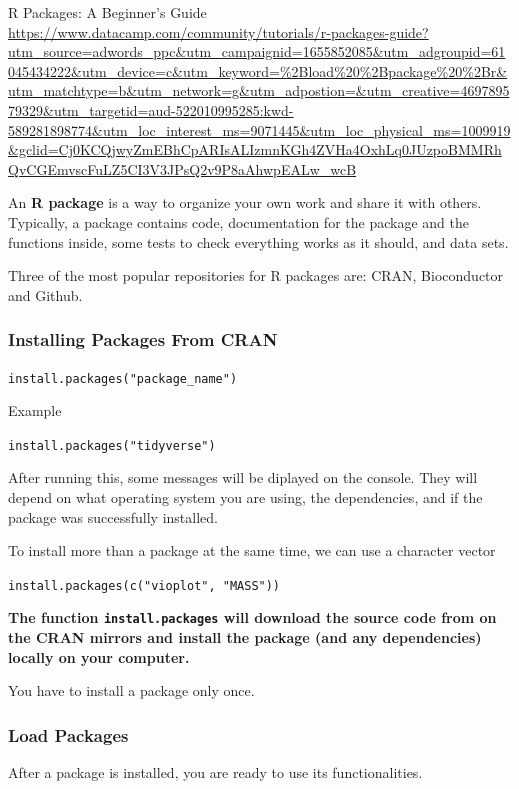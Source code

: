 \documentclass[
]{book}
\begin{document}
R Packages: A Beginner's Guide \url{https://www.datacamp.com/community/tutorials/r-packages-guide?utm_source=adwords_ppc\&utm_campaignid=1655852085\&utm_adgroupid=61045434222\&utm_device=c\&utm_keyword=\%2Bload\%20\%2Bpackage\%20\%2Br\&utm_matchtype=b\&utm_network=g\&utm_adpostion=\&utm_creative=469789579329\&utm_targetid=aud-522010995285:kwd-589281898774\&utm_loc_interest_ms=9071445\&utm_loc_physical_ms=1009919\&gclid=Cj0KCQjwyZmEBhCpARIsALIzmnKGh4ZVHa4OxhLq0JUzpoBMMRhQvCGEmvscFuLZ5CI3V3JPsQ2v9P8aAhwpEALw_wcB}

An \textbf{R package} is a way to organize your own work and share it with others. Typically, a package contains code, documentation for the package and the functions inside, some tests to check everything works as it should, and data sets.

Three of the most popular repositories for R packages are: CRAN, Bioconductor and Github.

\hypertarget{installing-packages-from-cran}{%
\subsubsection{Installing Packages From CRAN}\label{installing-packages-from-cran}}

\texttt{install.packages("package\_name")}

Example

\texttt{install.packages("tidyverse")}

After running this, some messages will be diplayed on the console. They will depend on what operating system you are using, the dependencies, and if the package was successfully installed.

To install more than a package at the same time, we can use a character vector

\texttt{install.packages(c("vioplot",\ "MASS"))}

\textbf{The function \texttt{install.packages} will download the source code from on the CRAN mirrors and install the package (and any dependencies) locally on your computer.}

You have to install a package only once.

\hypertarget{load-packages}{%
\subsubsection{Load Packages}\label{load-packages}}

After a package is installed, you are ready to use its functionalities.
\end{document}
